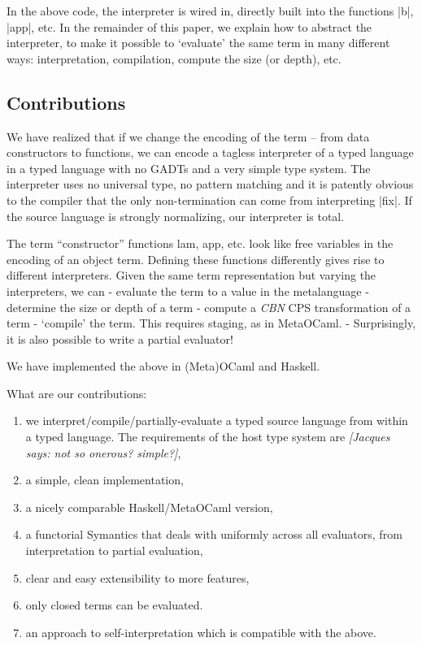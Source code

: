 \documentclass[preprint]{sigplanconf}
\newcommand{\jacques}[1]{{\it [Jacques says: #1]}}
\begin{document}
In the above code, the interpreter is wired in, directly built into the
functions |b|, |app|, etc.  In the remainder of this paper, 
we explain how to abstract the interpreter,
to make it possible to `evaluate' the same term in many different
ways: interpretation, compilation, compute the size (or depth), etc.

\subsection{Contributions}\label{contributions}

        We have realized that if we change the encoding of the term --
from data constructors to functions, we can encode a tagless
interpreter of a typed language in a typed language with no GADTs and
a very simple type system. The interpreter uses no universal type, no
pattern matching and it is patently obvious to the compiler that the
only non-termination can come from interpreting |fix|. If the source
language is strongly normalizing, our interpreter is total.

The term ``constructor'' functions lam, app, etc. look like free
variables in the encoding of an object term.  Defining these functions
differently gives rise to different interpreters.  Given the same term
representation but varying the interpreters, we can
	- evaluate the term to a value in the metalanguage
	- determine the size or depth of a term
    - compute a \emph{CBN} CPS transformation of a term
	- `compile' the term. This requires staging, as in MetaOCaml.
	- Surprisingly, it is also possible to write a partial evaluator! 

We have implemented the above in (Meta)OCaml and Haskell.

What are our contributions:
\begin{enumerate}
\item we interpret/compile/partially-evaluate a typed source language
   from within a typed language.  The requirements of the host type
   system are \jacques{not so onerous?  simple?},
\item a simple, clean implementation,
\item a nicely comparable Haskell/MetaOCaml version,
\item a functorial Symantics that deals with uniformly across all
evaluators, from interpretation to partial evaluation,
\item clear and easy extensibility to more features,
\item only closed terms can be evaluated.
\item an approach to self-interpretation which is compatible with the
  above.
\end{enumerate}
\end{document}
